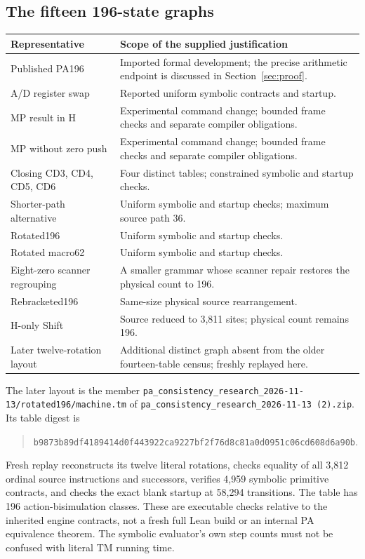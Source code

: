 \documentclass[11pt,letterpaper]{article}
\newcommand{\file}[1]{\texttt{\nolinkurl{#1}}}
\begin{document}
\subsection{The fifteen 196-state graphs}

\begin{center}
\small
\begin{tabular}{@{}p{2.45in}p{3.65in}@{}}
\toprule
Representative & Scope of the supplied justification\\
\midrule
Published PA196 & Imported formal development; the precise arithmetic endpoint is discussed in Section~\ref{sec:proof}.\\
A/D register swap & Reported uniform symbolic contracts and startup.\\
MP result in H & Experimental command change; bounded frame checks and separate compiler obligations.\\
MP without zero push & Experimental command change; bounded frame checks and separate compiler obligations.\\
Closing CD3, CD4, CD5, CD6 & Four distinct tables; constrained symbolic and startup checks.\\
Shorter-path alternative & Uniform symbolic and startup checks; maximum source path 36.\\
Rotated196 & Uniform symbolic and startup checks.\\
Rotated macro62 & Uniform symbolic and startup checks.\\
Eight-zero scanner regrouping & A smaller grammar whose scanner repair restores the physical count to 196.\\
Rebracketed196 & Same-size physical source rearrangement.\\
H-only Shift & Source reduced to 3,811 sites; physical count remains 196.\\
Later twelve-rotation layout & Additional distinct graph absent from the older fourteen-table census; freshly replayed here.\\
\bottomrule
\end{tabular}
\end{center}

The later layout is the member
\file{pa_consistency_research_2026-11-13/rotated196/machine.tm} of
\file{pa_consistency_research_2026-11-13 (2).zip}. Its table digest is
\begin{quote}\small
\nolinkurl{b9873b89df4189414d0f443922ca9227bf2f76d8c81a0d0951c06cd608d6a90b}.
\end{quote}
Fresh replay reconstructs its twelve literal rotations, checks equality of
all 3,812 ordinal source instructions and successors, verifies 4,959 symbolic
primitive contracts, and checks the exact blank startup at 58,294 transitions.
The table has 196 action-bisimulation classes. These are executable checks
relative to the inherited engine contracts, not a fresh full Lean build or
an internal PA equivalence theorem. The symbolic evaluator's own step counts
must not be confused with literal TM running time.
\end{document}
